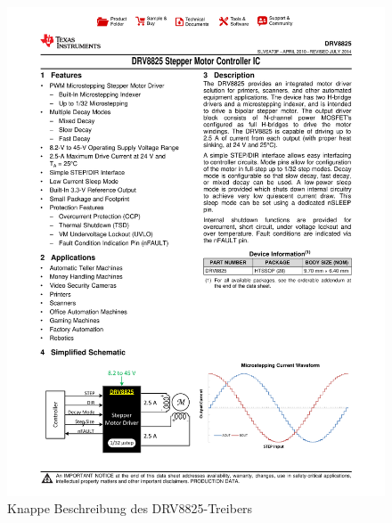 \begin{figure}[hb]
    \centering
    \includegraphics[scale=0.85,page=1]{fig/elektro/DRV8825.pdf}
    \caption{Knappe Beschreibung des DRV8825-Treibers}
\end{figure}

